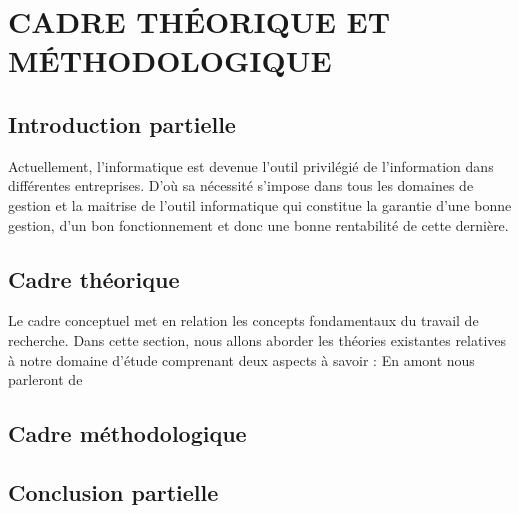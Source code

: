 \chapter[CADRE CONCEPTUEL ET THÉORIQUE]{CADRE THÉORIQUE ET MÉTHODOLOGIQUE}    
    \section{Introduction partielle}
    Actuellement, l’informatique est devenue l’outil privilégié de l’information dans
    différentes entreprises. D’où sa nécessité s’impose dans tous les domaines de gestion et la
    maitrise de l’outil informatique qui constitue la garantie d’une bonne gestion, d’un bon
    fonctionnement et donc une bonne rentabilité de cette dernière.
    \section[Cadre Conceptuel]{Cadre théorique}
    Le cadre conceptuel met en relation les concepts fondamentaux du travail de
    recherche. Dans cette section, nous allons aborder les théories existantes relatives à notre
    domaine d’étude comprenant deux aspects à savoir : En amont nous parleront de
    \section[Cadre théorique]{Cadre méthodologique}
    \section[Conclusion partielle]{Conclusion partielle}